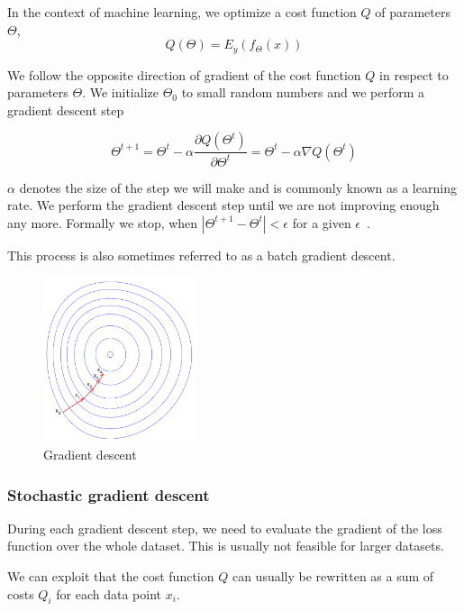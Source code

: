     In the context of machine learning, we optimize a cost function $Q$ of parameters $\Theta$, 
    $$Q(\Theta) = E_y(f_\Theta(x))$$
    
    We follow the opposite direction of gradient of the cost function $Q$ in respect to parameters $\Theta$. 
    We initialize $\Theta_0$ to small random numbers and we perform a gradient descent step
    
    \begin{equation}
      \Theta^{t+1} = \Theta^t - \alpha \frac{\partial Q(\Theta^t)}{\partial \Theta^t} = \Theta^t - \alpha \nabla Q(\Theta^t)
      \label{eq:gradient:descent}
    \end{equation}

    $\alpha$ denotes the size of the step we will make and is commonly known as a learning rate. 
    We perform the gradient descent step until we are not improving enough any more. 
    Formally we stop, when $|\Theta^{t+1} - \Theta^t| < \epsilon$ for a given $\epsilon$~\cite{bottou-bousquet-2008}.
    
    This process is also sometimes referred to as a batch gradient descent.

    \begin{figure}
    \centerline{\includegraphics[width=0.4\textwidth]{images/gradient_descent}}
    \caption[Gradient descent]{Gradient descent~\cite{pict}}
    \label{obr:gradient}
    \end{figure}
    
    \subsubsection{Stochastic gradient descent}
    
    During each gradient descent step, we need to evaluate the gradient of the loss function over the whole dataset.
    This is usually not feasible for larger datasets. 
    
    We can exploit that the cost function $Q$ can usually be rewritten as a sum of costs $Q_i$ for each data point $x_i$.
    
